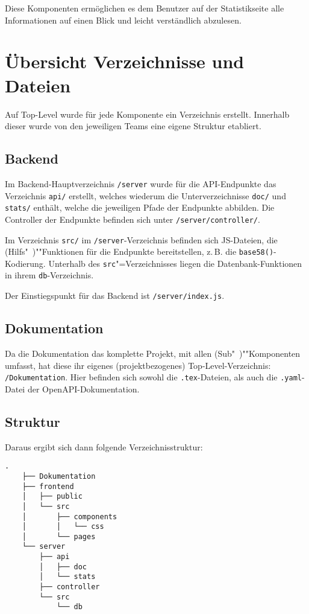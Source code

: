 \documentclass[a4paper,11pt,DIV=12]{scrreprt}%
\begin{document}
Diese Komponenten ermöglichen es dem Benutzer auf der Statistikseite alle Informationen auf einen Blick und leicht verständlich abzulesen.

\section{Übersicht Verzeichnisse und Dateien}
Auf Top-Level wurde für jede Komponente ein Verzeichnis erstellt. Innerhalb dieser wurde von den jeweiligen Teams eine eigene Struktur etabliert.

\subsection{Backend}
Im Backend-Hauptverzeichnis \texttt{/server} wurde für die \ac{API}-Endpunkte das Verzeichnis \texttt{api/} erstellt, welches wiederum die Unterverzeichnisse \texttt{doc/} und \texttt{stats/} enthält, welche die jeweiligen Pfade der Endpunkte abbilden. Die Controller der Endpunkte befinden sich unter \texttt{/server/controller/}.

Im Verzeichnis \texttt{src/} im \texttt{/server}-Verzeichnis befinden sich \ac{JS}-Dateien, die (Hilfs"~)""Funktionen für die Endpunkte bereitstellen, z.\,B. die \texttt{base58()}-Kodierung. Unterhalb des \texttt{src}"=Verzeichnisses liegen die Datenbank-Funktionen in ihrem \texttt{db}-Verzeichnis.

Der Einstiegspunkt für das Backend ist \texttt{/server/index.js}.


\subsection{Dokumentation}
Da die Dokumentation das komplette Projekt, mit allen (Sub"~)""Komponenten umfasst, hat diese ihr eigenes (projektbezogenes) Top-Level-Verzeichnis: \texttt{/Dokumentation}. Hier befinden sich sowohl die \texttt{.tex}-Dateien, als auch die \texttt{.yaml}-Datei der OpenAPI-Dokumentation.
\subsection{Struktur}
Daraus ergibt sich dann folgende Verzeichnisstruktur:
\begin{Verbatim}[samepage=true]
    .
    ├── Dokumentation
    ├── frontend
    │   ├── public
    │   └── src
    │       ├── components
    │       │   └── css
    │       └── pages
    └── server
        ├── api
        │   ├── doc
        │   └── stats
        ├── controller
        └── src
            └── db
    
\end{Verbatim}
\end{document}
